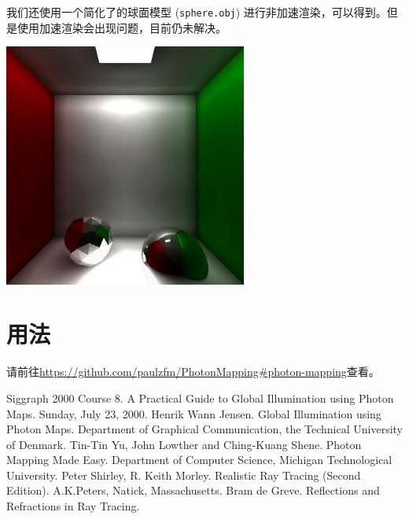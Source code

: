 \documentclass[11pt, a4paper]{article}
\makeatletter
\newcommand\fcaption{\def\@captype{figure}\caption}
\makeatother
\begin{document}
我们还使用一个简化了的球面模型 (\texttt{sphere.obj}) 进行非加速渲染，可以得到\label{sp}。但是使用加速渲染会出现问题，目前仍未解决。

\begin{center}
    \includegraphics[width=8cm]{../outputs/sphere_model_slow.jpeg}
    \fcaption{Sphere (非加速模型)}\label{sp}
\end{center}

\section{用法}

请前往\url{https://github.com/paulzfm/PhotonMapping#photon-mapping}查看。

\begin{thebibliography}{99}
     Siggraph 2000 Course 8. A Practical Guide to Global Illumination using Photon Maps. Sunday, July 23, 2000.
     Henrik Wann Jensen. Global Illumination using Photon Maps. Department of Graphical Communication, the Technical University of Denmark.
     Tin-Tin Yu, John Lowther and Ching-Kuang Shene. Photon Mapping Made Easy. Department of Computer Science, Michigan Technological University.
     Peter Shirley, R. Keith Morley. Realistic Ray Tracing (Second Edition). A.K.Peters, Natick, Massachusetts.
     Bram de Greve. Reflections and Refractions in Ray Tracing.
\end{thebibliography}
\end{document}
